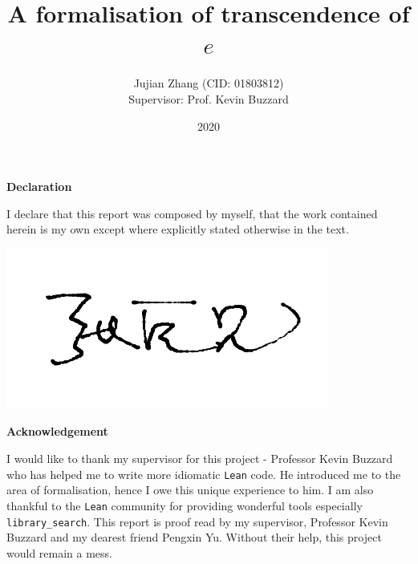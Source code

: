 \documentclass{report}
\title{A formalisation of transcendence of $e$}
\author{Jujian Zhang (CID: 01803812)\\[.5cm]{Supervisor: Prof. Kevin Buzzard}}
\date{2020}
\theoremstyle{definition}
\begin{document}
\maketitle

\clearpage\thispagestyle{empty}\addtocounter{page}{-1}
\begin{center}
  \textbf{Declaration}
\end{center}
I declare that this report was composed by myself, that the work contained herein is my own except where explicitly stated otherwise in the text.

\begin{flushright}
  \includegraphics[height=1.5\baselineskip]{signature.png}
\end{flushright}
\clearpage

\begin{center}
  \textbf{Acknowledgement}
\end{center}
I would like to thank my supervisor for this project - Professor Kevin Buzzard who has helped me to write more idiomatic {\tt \small Lean} code. He introduced me to the area of formalisation, hence I owe this unique experience to him. I am also thankful to the {\tt\small Lean} community for providing wonderful tools especially {\tt\small library\_search}. This report is proof read by my supervisor, Professor Kevin Buzzard and my dearest friend Pengxin Yu. Without their help, this project would remain a mess.

\clearpage
\end{document}
